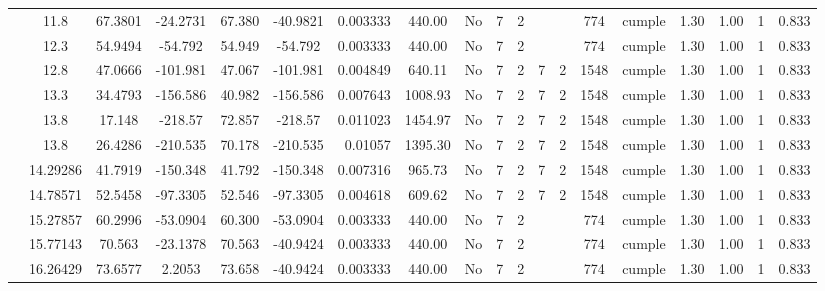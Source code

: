 \begin{table}[H]
{\begin{tabular}{|c|c|c|c|c|c|r|c|c|c|c|c|c|c|c|c|c|c|c|}
\cline{2-19}        & 11.8 & 67.3801 & -24.2731 & 67.380 & -40.9821 & 0.003333 & 440.00 & No  & 7   & 2   &     &     & 774 & \cellcolor[rgb]{ .776,  .937,  .808}cumple & 1.30 & 1.00 & 1   & 0.833 \bigstrut\\
\cline{2-19}        & 12.3 & 54.9494 & -54.792 & 54.949 & -54.792 & 0.003333 & 440.00 & No  & 7   & 2   &     &     & 774 & \cellcolor[rgb]{ .776,  .937,  .808}cumple & 1.30 & 1.00 & 1   & 0.833 \bigstrut\\
\cline{2-19}        & 12.8 & 47.0666 & -101.981 & 47.067 & -101.981 & 0.004849 & 640.11 & No  & 7   & 2   & 7   & 2   & 1548 & \cellcolor[rgb]{ .776,  .937,  .808}cumple & 1.30 & 1.00 & 1   & 0.833 \bigstrut\\
\cline{2-19}        & 13.3 & 34.4793 & -156.586 & 40.982 & -156.586 & 0.007643 & 1008.93 & No  & 7   & 2   & 7   & 2   & 1548 & \cellcolor[rgb]{ .776,  .937,  .808}cumple & 1.30 & 1.00 & 1   & 0.833 \bigstrut\\
\cline{2-19}        & 13.8 & 17.148 & -218.57 & 72.857 & -218.57 & 0.011023 & 1454.97 & No  & 7   & 2   & 7   & 2   & 1548 & \cellcolor[rgb]{ .776,  .937,  .808}cumple & 1.30 & 1.00 & 1   & 0.833 \bigstrut\\
\cline{2-19}        & 13.8 & 26.4286 & -210.535 & 70.178 & -210.535 & 0.01057 & 1395.30 & No  & 7   & 2   & 7   & 2   & 1548 & \cellcolor[rgb]{ .776,  .937,  .808}cumple & 1.30 & 1.00 & 1   & 0.833 \bigstrut\\
\cline{2-19}        & 14.29286 & 41.7919 & -150.348 & 41.792 & -150.348 & 0.007316 & 965.73 & No  & 7   & 2   & 7   & 2   & 1548 & \cellcolor[rgb]{ .776,  .937,  .808}cumple & 1.30 & 1.00 & 1   & 0.833 \bigstrut\\
\cline{2-19}        & 14.78571 & 52.5458 & -97.3305 & 52.546 & -97.3305 & 0.004618 & 609.62 & No  & 7   & 2   & 7   & 2   & 1548 & \cellcolor[rgb]{ .776,  .937,  .808}cumple & 1.30 & 1.00 & 1   & 0.833 \bigstrut\\
\cline{2-19}        & 15.27857 & 60.2996 & -53.0904 & 60.300 & -53.0904 & 0.003333 & 440.00 & No  & 7   & 2   &     &     & 774 & \cellcolor[rgb]{ .776,  .937,  .808}cumple & 1.30 & 1.00 & 1   & 0.833 \bigstrut\\
\cline{2-19}        & 15.77143 & 70.563 & -23.1378 & 70.563 & -40.9424 & 0.003333 & 440.00 & No  & 7   & 2   &     &     & 774 & \cellcolor[rgb]{ .776,  .937,  .808}cumple & 1.30 & 1.00 & 1   & 0.833 \bigstrut\\
\cline{2-19}        & 16.26429 & 73.6577 & 2.2053 & 73.658 & -40.9424 & 0.003333 & 440.00 & No  & 7   & 2   &     &     & 774 & \cellcolor[rgb]{ .776,  .937,  .808}cumple & 1.30 & 1.00 & 1   & 0.833 \bigstrut\\

\end{tabular}}
\end{table}
